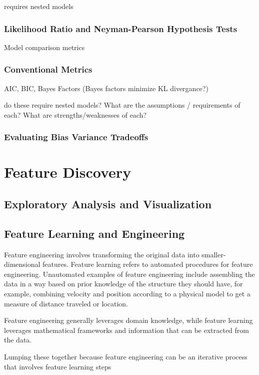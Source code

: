 \documentclass[]{article}
\begin{document}
requires nested models

\section{Likelihood Ratio and Neyman-Pearson Hypothesis Tests}

Model comparison metrics

\section{Conventional Metrics}

AIC, BIC, Bayes Factors (Bayes factors minimize KL divergance?)

do these require nested models? What are the assumptions / requirements
of each? What are strengths/weaknesses of each?

\section{Evaluating Bias Variance Tradeoffs}

\part{Feature Discovery}

\chapter{Exploratory Analysis and Visualization}

\chapter{Feature Learning and Engineering}

Feature engineering involves transforming the original data into
smaller-dimensional features. Feature learning refers to automated
procedures for feature engineering. Unautomated examples of feature
engineering include assembling the data in a way based on prior
knowledge of the structure they should have, for example, combining
velocity and position according to a physical model to get a measure of
distance traveled or location.

Feature engineering generally leverages domain knowledge, while feature
learning leverages mathematical frameworks and information that can be
extracted from the data.

Lumping these together because feature engineering can be an iterative
process that involves feature learning steps
\end{document}
